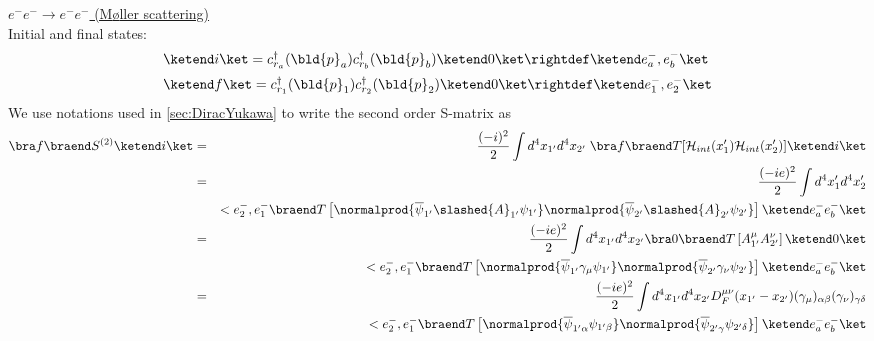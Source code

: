 
\bigskip


\noindent
\underline{$e^- e^- \to e^- e^-$ (M{\o}ller scattering)}\\
Initial and final states:
\begin{eqnarray}
\begin{array}{l}
\ketend i \ket
= c_{r_a}^\dagger (\bld{p}_a) c_{r_b}^\dagger (\bld{p}_b) \ketend 0 \ket
\rightdef \ketend e^-_a, e^-_b \ket
\vspace{2mm}
\\
\ketend f \ket
= c_{r_1}^\dagger (\bld{p}_1) c_{r_2}^\dagger (\bld{p}_2) \ketend 0 \ket
\rightdef \ketend e^-_1, e^-_2 \ket
\end{array}
\end{eqnarray}
We use notations used in \ref{sec:DiracYukawa} to write
the second order S-matrix as
\begin{eqnarray}
\bra f \braend S^{(2)} \ketend i \ket
&=&
\frac{(-i)^2}{2}
\int d^4 x_{1'} d^4 x_{2'}
\;\bra f \braend T[ {\cal H}_{int}(x_1') {\cal H}_{int}(x_2')] \ketend i \ket
\nonumber\\
&=&
\frac{(-ie)^2}{2}
\int d^4 x_1' d^4 x_2'
\nonumber\\
&&
<e^-_2, e^-_1 \braend T \left[
\normalprod{
\overline{\psi}_{1'}
\slashed{A}_{1'} \psi_{1'}
}
\normalprod{
\overline{\psi}_{2'}
\slashed{A}_{2'} \psi_{2'}
}
\right]
\ketend e^-_a e^-_b \ket
\nonumber\\
&=&
\frac{(-ie)^2}{2}
\int d^4 x_{1'} d^4 x_{2'}
\bra 0 \braend T\left[
A_{1'}^\mu A_{2'}^\nu
\right] \ketend 0 \ket
\nonumber\\
&&
<e^-_2, e^-_1 \braend T \left[
\normalprod{
\overline{\psi}_{1'}
\gamma_\mu \psi_{1'}
}
\normalprod{
\overline{\psi}_{2'}
\gamma_\nu \psi_{2'}
}
\right]
\ketend e^-_a e^-_b \ket
\nonumber\\
&=&
\frac{(-ie)^2}{2}
\int d^4 x_{1'} d^4 x_{2'}
D_F^{\mu \nu}(x_{1'} - x_{2'}) 
(\gamma_\mu)_{\alpha \beta}
(\gamma_\nu)_{\gamma \delta} 
\nonumber\\
&&
<e^-_2, e^-_1 \braend T \left[
\normalprod{
\overline{\psi}_{1' \alpha}
 \psi_{1' \beta}
}
\normalprod{
\overline{\psi}_{2' \gamma}
\psi_{2' \delta}
}
\right]
\ketend e^-_a e^-_b \ket
\nonumber\\
\label{eqn:SmatrixMoller1}
\end{eqnarray}

